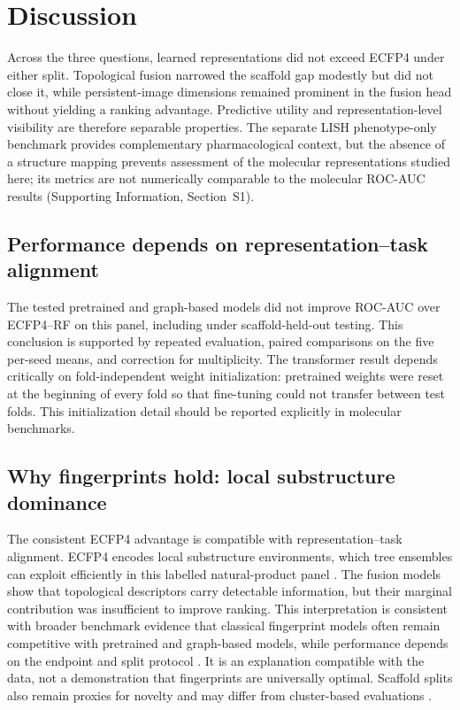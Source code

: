 \documentclass[11pt,a4paper]{article}
\begin{document}
\section{Discussion}

Across the three questions, learned representations did not exceed ECFP4 under either split. Topological fusion narrowed the scaffold gap modestly but did not close it, while persistent-image dimensions remained prominent in the fusion head without yielding a ranking advantage. Predictive utility and representation-level visibility are therefore separable properties. The separate LISH phenotype-only benchmark provides complementary pharmacological context, but the absence of a structure mapping prevents assessment of the molecular representations studied here; its metrics are not numerically comparable to the molecular ROC-AUC results (Supporting Information, Section~S1).

\subsection{Performance depends on representation--task alignment}

The tested pretrained and graph-based models did not improve ROC-AUC over ECFP4--RF on this panel, including under scaffold-held-out testing. This conclusion is supported by repeated evaluation, paired comparisons on the five per-seed means, and correction for multiplicity. The transformer result depends critically on fold-independent weight initialization: pretrained weights were reset at the beginning of every fold so that fine-tuning could not transfer between test folds. This initialization detail should be reported explicitly in molecular benchmarks.

\subsection{Why fingerprints hold: local substructure dominance}

The consistent ECFP4 advantage is compatible with representation--task alignment. ECFP4 encodes local substructure environments, which tree ensembles can exploit efficiently in this labelled natural-product panel \citep{ecfp_2010,learning_mol_repr_2020}. The fusion models show that topological descriptors carry detectable information, but their marginal contribution was insufficient to improve ranking. This interpretation is consistent with broader benchmark evidence that classical fingerprint models often remain competitive with pretrained and graph-based models, while performance depends on the endpoint and split protocol \citep{guo_ding_2026,benchmark_pretrained_2025}. It is an explanation compatible with the data, not a demonstration that fingerprints are universally optimal. Scaffold splits also remain proxies for novelty and may differ from cluster-based evaluations \citep{guo2024scaffold}.
\end{document}
